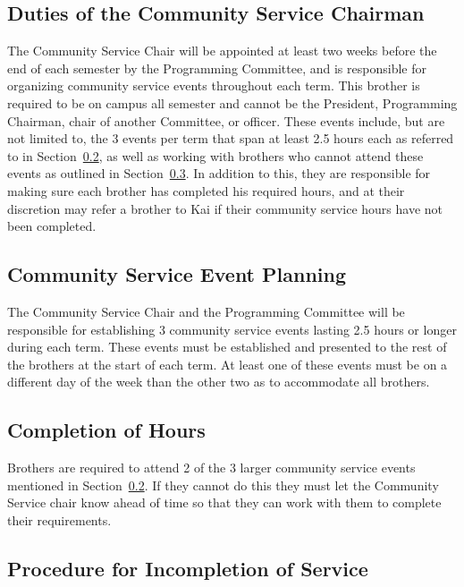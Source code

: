 \subsection{Duties of the Community Service Chairman}
\label{sec:duties-of-the-community-service-chairman}

The Community Service Chair will be appointed at least two weeks before the end
of each semester by the Programming Committee, and is responsible for organizing
community service events throughout each term.
This brother is required to be on campus all semester and cannot be the
President, Programming Chairman, chair of another Committee, or officer.
These events include, but are not limited to, the 3 events per term that span at
least 2.5 hours each as referred to in
Section~\ref{sec:community-service-event-planning}, as well as working with
brothers who cannot attend these events as outlined in
Section~\ref{sec:completion-of-hours}.
In addition to this, they are responsible for making sure each brother has
completed his required hours, and at their discretion may refer a brother to Kai
if their community service hours have not been completed.

\subsection{Community Service Event Planning}
\label{sec:community-service-event-planning}

The Community Service Chair and the Programming Committee will be responsible
for establishing 3 community service events lasting 2.5 hours or longer during
each term.
These events must be established and presented to the rest of the brothers at
the start of each term.
At least one of these events must be on a different day of the week than the
other two as to accommodate all brothers.

\subsection{Completion of Hours}
\label{sec:completion-of-hours}

Brothers are required to attend 2 of the 3 larger community service events
mentioned in Section~\ref{sec:community-service-event-planning}.
If they cannot do this they must let the Community Service chair know ahead of
time so that they can work with them to complete their requirements.

\subsection{Procedure for Incompletion of Service}
\label{sec:procedure-for-incompletion-of-service}

